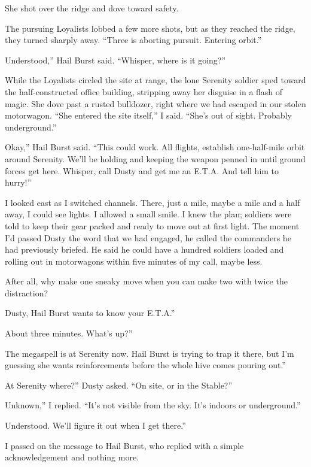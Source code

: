 She shot over the ridge and dove toward safety.

The pursuing Loyalists lobbed a few more shots, but as they reached the ridge, they turned sharply away. “Three is aborting pursuit. Entering orbit.”

\leavevmode{}Understood,” Hail Burst said. “Whisper, where is it going?”

While the Loyalists circled the site at range, the lone Serenity soldier sped toward the half-constructed office building, stripping away her disguise in a flash of magic. She dove past a rusted bulldozer, right where we had escaped in our stolen motorwagon. “She entered the site itself,” I said. “She’s out of sight. Probably underground.”

\leavevmode{}Okay,” Hail Burst said. “This could work. All flights, establish one-half-mile orbit around Serenity. We’ll be holding and keeping the weapon penned in until ground forces get here. Whisper, call Dusty and get me an E.T.A. And tell him to hurry!”

I looked east as I switched channels. There, just a mile, maybe a mile and a half away, I could see lights. I allowed a small smile. I knew the plan; soldiers were told to keep their gear packed and ready to move out at first light. The moment I’d passed Dusty the word that we had engaged, he called the commanders he had previously briefed. He said he could have a hundred soldiers loaded and rolling out in motorwagons within five minutes of my call, maybe less.

After all, why make one sneaky move when you can make two with twice the distraction?

\leavevmode{}Dusty, Hail Burst wants to know your E.T.A.”

\leavevmode{}About three minutes. What’s up?”

\leavevmode{}The megaspell is at Serenity now. Hail Burst is trying to trap it there, but I’m guessing she wants reinforcements before the whole hive comes pouring out.”

\leavevmode{}At Serenity where?” Dusty asked. “On site, or in the Stable?”

\leavevmode{}Unknown,” I replied. “It’s not visible from the sky. It’s indoors or underground.”

\leavevmode{}Understood. We’ll figure it out when I get there.”

I passed on the message to Hail Burst, who replied with a simple acknowledgement and nothing more.

